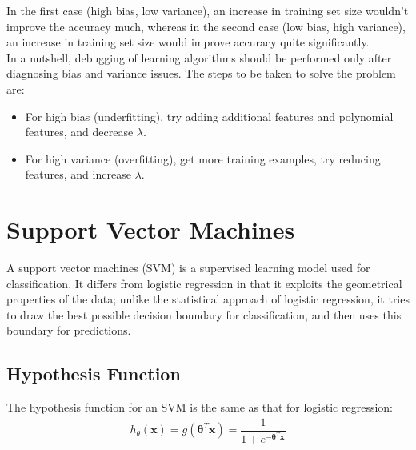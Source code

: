 \documentclass[a4paper, 12pt]{report}
\begin{document}
In the first case (high bias, low variance), an increase in training set size wouldn't improve the accuracy much, whereas in the second case (low bias, high variance), an increase in training set size would improve accuracy quite significantly. \\
\break
In a nutshell, debugging of learning algorithms should be performed only after diagnosing bias and variance issues. The steps to be taken to solve the problem are:
\begin{itemize}
\item For high bias (underfitting), try adding additional features and polynomial features, and decrease $\lambda$.
\item For high variance (overfitting), get more training examples, try reducing features, and increase $\lambda$.
\end{itemize}

\newpage

\chapter{Support Vector Machines}
A support vector machines (SVM) is a supervised learning model used for classification. It differs from logistic regression in that it exploits the geometrical properties of the data; unlike the statistical approach of logistic regression, it tries to draw the best possible decision boundary for classification, and then uses this boundary for predictions.

\section{Hypothesis Function}
The hypothesis function for an SVM is the same as that for logistic regression:
\begin{align*}
h_{\theta}\left(\bm{x}\right) = g\left(\bm{\theta}^T\bm{x}\right) = \dfrac{1}{1+e^{-\bm{\theta}^T\bm{x}}}
\end{align*}
\end{document}

